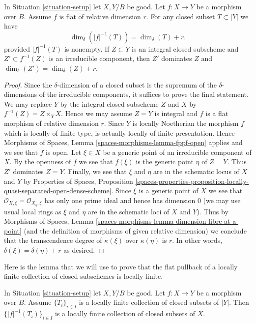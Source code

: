 \begin{lemma}
\label{lemma-flat-inverse-image-dimension}
In Situation \ref{situation-setup} let $X, Y/B$ be good.
Let $f : X \to Y$ be a morphism over $B$.
Assume $f$ is flat of relative dimension $r$.
For any closed subset $T \subset |Y|$ we have
$$
\dim_\delta(|f|^{-1}(T)) = \dim_\delta(T) + r.
$$
provided $|f|^{-1}(T)$ is nonempty.
If $Z \subset Y$ is an integral closed subscheme and
$Z' \subset f^{-1}(Z)$ is an irreducible component, then
$Z'$ dominates $Z$ and $\dim_\delta(Z') = \dim_\delta(Z) + r$.
\end{lemma}

\begin{proof}
Since the $\delta$-dimension of a closed subset is the supremum of
the $\delta$-dimensions of the irreducible components, it suffices
to prove the final statement. We may replace $Y$ by the
integral closed subscheme $Z$ and $X$ by $f^{-1}(Z) = Z \times_Y X$.
Hence we may assume $Z = Y$ is integral and $f$ is a flat morphism
of relative dimension $r$. Since $Y$ is locally Noetherian the
morphism $f$ which is locally of finite type,
is actually locally of finite presentation. Hence
Morphisms of Spaces, Lemma \ref{spaces-morphisms-lemma-fppf-open}
applies and we see that $f$ is open.
Let $\xi \in X$ be a generic point of an irreducible component
of $X$. By the openness of $f$ we see that $f(\xi)$ is the
generic point $\eta$ of $Z = Y$. Thus $Z'$ dominates $Z = Y$.
Finally, we see  that $\xi$ and $\eta$ are in the schematic
locus of $X$ and $Y$ by
Properties of Spaces, Proposition
\ref{spaces-properties-proposition-locally-quasi-separated-open-dense-scheme}.
Since $\xi$ is a generic point of $X$ we see that
$\mathcal{O}_{X, \xi} = \mathcal{O}_{X_\eta, \xi}$ has only one
prime ideal and hence has dimension $0$ (we may use usual
local rings as $\xi$ and $\eta$ are in the schematic loci
of $X$ and $Y$). Thus by Morphisms of Spaces, Lemma
\ref{spaces-morphisms-lemma-dimension-fibre-at-a-point}
(and the definition of morphisms of given relative dimension)
we conclude that the transcendence
degree of $\kappa(\xi)$ over $\kappa(\eta)$ is $r$.
In other words, $\delta(\xi) = \delta(\eta) + r$ as desired.
\end{proof}

\noindent
Here is the lemma that we will use to prove that the flat pullback
of a locally finite collection of closed subschemes is locally finite.

\begin{lemma}
\label{lemma-inverse-image-locally-finite}
In Situation \ref{situation-setup} let $X, Y/B$ be good.
Let $f : X \to Y$ be a morphism over $B$.
Assume $\{T_i\}_{i \in I}$ is a locally
finite collection of closed subsets of $|Y|$.
Then $\{|f|^{-1}(T_i)\}_{i \in I}$ is a locally finite
collection of closed subsets of $X$.
\end{lemma}

